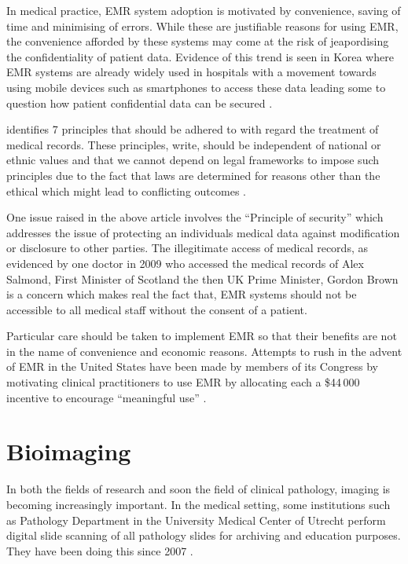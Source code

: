 \documentclass[british,a4paper, 12pt]{article}
\begin{document}
In medical practice, EMR system adoption is motivated by convenience, saving of time and 
minimising of errors. While these are justifiable reasons for using EMR, the convenience 
afforded by these systems may come at the risk of jeapordising the confidentiality of 
patient data. Evidence of this trend is seen in Korea where EMR systems are already widely 
used in hospitals with a movement towards using mobile devices such as smartphones to 
access these data leading some to question how patient confidential data can be secured
\parencite{yeo2012pitfalls}.

\citeauthor*{kluge2000professional} identifies 7 principles that should be adhered to
with regard the treatment of medical records. These principles,
\citeauthor*{kluge2000professional} write, should be independent of national or ethnic
values and that we cannot depend on legal frameworks to impose such principles due to
the fact that laws are determined for reasons other than the ethical which might lead to
conflicting outcomes \parencite{kluge2000professional}.

One issue raised in the above article involves the ``Principle of security'' which
addresses the issue of protecting an individuals medical data against modification or
disclosure to other parties. The illegitimate access of medical records,
as evidenced by one doctor in 2009 who accessed the medical records of Alex Salmond,
First Minister of Scotland the then UK Prime Minister, Gordon Brown
\parencite{dailyrecord2010doctor} is a concern which makes real the fact that, EMR
systems should not be accessible to all medical staff without the consent of a patient.

Particular care should be taken to implement EMR so that their benefits are not in the
name of convenience and economic reasons. Attempts to rush in the advent of EMR in the
United States have been made by members of its Congress by motivating clinical 
practitioners to use EMR  by allocating each a \$44\,000 incentive to encourage ``meaningful use''
\parencite{jha2010meaningful}.

\section{Bioimaging}
In both the fields of research and soon the field of clinical pathology, imaging is becoming 
increasingly important. In the medical setting, some institutions such as Pathology Department 
in the University Medical Center of Utrecht perform digital slide scanning of all pathology 
slides for archiving and education purposes. They have been doing this since 2007
\parencite{stathonikos2013going}.
\end{document}
